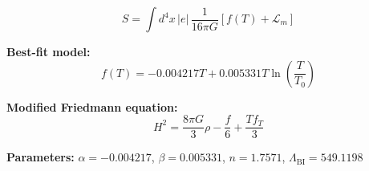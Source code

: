 
\begin{equation}
  S = \int d^4x \, |e| \, \frac{1}{16\pi G} \left[ f(T) + \mathcal{L}_m \right]
\end{equation}

\textbf{Best-fit model:}
\begin{equation}
  f(T) = -0.004217 T + 0.005331 T \ln\!\left(\frac{T}{T_0}\right)
\end{equation}

\textbf{Modified Friedmann equation:}
\begin{equation}
  H^2 = \frac{8\pi G}{3} \rho - \frac{f}{6} + \frac{T f_T}{3}
\end{equation}

\textbf{Parameters:}
$\alpha = -0.004217$, \quad
$\beta = 0.005331$, \quad
$n = 1.7571$, \quad
$\Lambda_{\text{BI}} = 549.1198$
